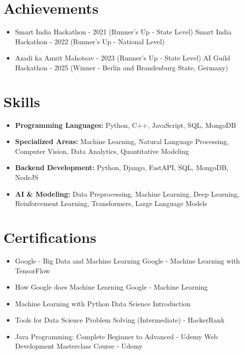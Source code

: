 \documentclass[a4paper,10pt]{article}
\begin{document}
\section*{Achievements}
\begin{itemize}
\item Smart India Hackathon - 2021 (Runner's Up - State Level) \hfill Smart India Hackathon - 2022 (Runner's Up - National Level)
\item Azadi ka Amrit Mahotsav - 2023 (Runner's Up - State Level) \hfill AI Guild Hackathon - 2025 (Winner - Berlin and Brandenburg State, Germany)
\end{itemize}

\section*{Skills}
\begin{itemize}
  \item \textbf{Programming Languages:} Python, C++, JavaScript, SQL, MongoDB
  \item \textbf{Specialized Areas:} Machine Learning, Natural Language Processing, Computer Vision, Data Analytics, Quantitative Modeling
  \item \textbf{Backend Development:} Python, Django, FastAPI, SQL, MongoDB, NodeJS
  \item \textbf{AI \& Modeling:} Data Preprocessing, Machine Learning, Deep Learning, Reinforcement Learning, Transformers, Large Language Models
\end{itemize}

\section*{Certifications}
\begin{itemize}
\item Google - Big Data and Machine Learning \hfill Google - Machine Learning with TensorFlow
\item How Google does Machine Learning \hfill Google - Machine Learning
\item Machine Learning with Python \hfill Data Science Introduction
\item Tools for Data Science \hfill Problem Solving (Intermediate) - HackerRank
\item Java Programming: Complete Beginner to Advanced - Udemy \hfill Web Development Masterclass Course - Udemy
\end{itemize}
\end{document}
